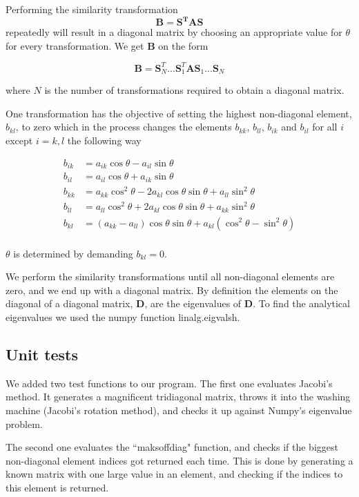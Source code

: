 \documentclass{article}
\begin{document}
Performing the similarity transformation
$$\mathbf{B}=\mathbf{S^TAS}$$
repeatedly will result in a diagonal matrix by choosing an appropriate value for $\theta$ for every transformation. We get $\mathbf{B}$ on the form

$$\mathbf{B}=\mathbf{S}^T_N...\mathbf{S}^T_1\mathbf{A}\mathbf{S}_1...\mathbf{S}_N$$

where $N$ is the number of transformations required to obtain a diagonal matrix.

One transformation has the objective of setting the highest non-diagonal element, $b_{kl}$, to zero which in the process changes the elements $b_{kk}$, $b_{ll}$, $b_{ik}$ and $b_{il}$ for all $i$ except $i=k,l$ the following way

\begin{equation*}
\begin{split}
b_{ik}&=a_{ik}\cos\theta-a_{il}\sin\theta\\
b_{il}&=a_{il}\cos\theta+a_{ik}\sin\theta\\
b_{kk}&=a_{kk}\cos^2\theta-2a_{kl}\cos\theta\sin\theta+a_{ll}\sin^2\theta\\
b_{ll}&=a_{ll}\cos^2\theta+2a_{kl}\cos\theta\sin\theta+a_{kk}\sin^2\theta\\
b_{kl}&=(a_{kk}-a_{ll})\cos\theta\sin\theta+a_{kl}(\cos^2\theta-\sin^2\theta)\\
\end{split}
\end{equation*}

$\theta$ is determined by demanding $b_{kl}=0$.

We perform the similarity transformations until all non-diagonal elements are zero, and we end up with a diagonal matrix. By definition the elements on the diagonal of a diagonal matrix, $\mathbf{D}$, are the eigenvalues of $\mathbf{D}$.
\vskip0.5cm
To find the analytical eigenvalues we used the numpy function linalg.eigvalsh.


\subsection{Unit tests}

We added two test functions to our program. The first one evaluates Jacobi's method. It generates a magnificent tridiagonal matrix, throws it into the washing machine (Jacobi's rotation method), and checks it up against Numpy's eigenvalue problem.

The second one evaluates the ``maksoffdiag" function, and checks if the biggest non-diagonal element indices got returned each time. This is done by generating a known matrix with one large value in an element, and checking if the indices to this element is returned.
\end{document}
